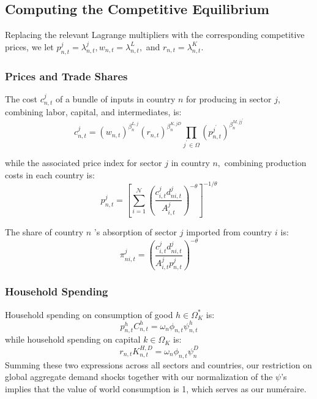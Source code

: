 \documentclass[12pt, bibtotoc, tablecaptionabove, figurecaptionabove, fleqn]{article}
\begin{document}
\subsection{Computing the Competitive Equilibrium}\label{EQ}
Replacing the relevant Lagrange multipliers with the corresponding competitive prices, we let $p_{n, t}^{j}=\lambda_{n, t}^{j}, w_{n, t}=\lambda_{n, t}^{L},$ and $r_{n, t}=\lambda_{n, t}^{K} .$ 

\subsubsection{Prices and Trade Shares}
The cost $c_{n, t}^{j}$ of a bundle of inputs in country $n$ for producing in sector $j$, combining labor, capital,
and intermediates, is:
\begin{equation*}
	c_{n, t}^{j}=\left(w_{n, t}\right)^{\beta_{n}^{L, j}} \left(r_{n, t}\right)^{\beta_{n}^{K, j D}} \prod_{j^{\prime} \in \Omega}\left(p_{n, t}^{j^{\prime}}\right)^{\beta_{n}^{M, j j^{\prime}}}
\end{equation*}

while the associated price index for sector $j$ in country $n,$ combining production costs in each country is:
\begin{equation*}
	p_{n, t}^{j}=\left[\sum_{i=1}^{\mathcal{N}}\left(\frac{c_{i, t}^{j} d_{n i, t}^{j}}{A_{i, t}^{j}}\right)^{-\theta}\right]^{-1 / \theta}
\end{equation*}

The share of country $n$ 's absorption of sector $j$ imported from country $i$ is:
\begin{equation*}
\pi_{n i, t}^{j}=\left(\frac{c_{i, t}^{j} d_{n i, t}^{j}}{A_{i, t}^{j} p_{n, t}^{j}}\right)^{-\theta}
\end{equation*}

\subsubsection{Household Spending}
Household spending on consumption of good $h \in \Omega_{K}^{*}$ is:
\begin{equation*}
p_{n, t}^{h} C_{n, t}^{h}=\omega_{n} \phi_{n, t} \psi_{n, t}^{h}
\end{equation*}
while household spending on capital $k \in \Omega_{K}$ is:
\begin{equation*}
r_{n, t} K_{n, t}^{H, D}=\omega_{n} \phi_{n, t} \psi^{D}_n
\end{equation*}
Summing these two expressions across all sectors and countries, our restriction on global aggregate demand shocks together with our normalization of the $\psi$'s implies that the value of world consumption is 1, which serves as our num\'eraire.
\end{document}
